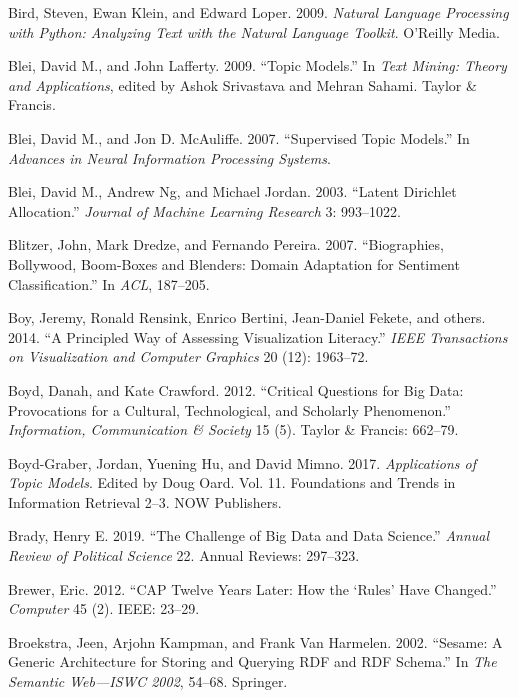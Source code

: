 \documentclass[]{krantz}
\begin{document}
\hypertarget{ref-bird-09}{}
Bird, Steven, Ewan Klein, and Edward Loper. 2009. \emph{Natural Language
Processing with Python: Analyzing Text with the Natural Language
Toolkit}. O'Reilly Media.

\hypertarget{ref-blei-09}{}
Blei, David M., and John Lafferty. 2009. ``Topic Models.'' In \emph{Text
Mining: Theory and Applications}, edited by Ashok Srivastava and Mehran
Sahami. Taylor \& Francis.

\hypertarget{ref-blei-07b}{}
Blei, David M., and Jon D. McAuliffe. 2007. ``Supervised Topic Models.''
In \emph{Advances in Neural Information Processing Systems}.

\hypertarget{ref-blei-03}{}
Blei, David M., Andrew Ng, and Michael Jordan. 2003. ``Latent Dirichlet
Allocation.'' \emph{Journal of Machine Learning Research} 3: 993--1022.

\hypertarget{ref-blitzer-07}{}
Blitzer, John, Mark Dredze, and Fernando Pereira. 2007. ``Biographies,
Bollywood, Boom-Boxes and Blenders: Domain Adaptation for Sentiment
Classification.'' In \emph{ACL}, 187--205.

\hypertarget{ref-boy2014principled}{}
Boy, Jeremy, Ronald Rensink, Enrico Bertini, Jean-Daniel Fekete, and
others. 2014. ``A Principled Way of Assessing Visualization Literacy.''
\emph{IEEE Transactions on Visualization and Computer Graphics} 20 (12):
1963--72.

\hypertarget{ref-boyd2012critical}{}
Boyd, Danah, and Kate Crawford. 2012. ``Critical Questions for Big Data:
Provocations for a Cultural, Technological, and Scholarly Phenomenon.''
\emph{Information, Communication \& Society} 15 (5). Taylor \& Francis:
662--79.

\hypertarget{ref-boyd-graber-17}{}
Boyd-Graber, Jordan, Yuening Hu, and David Mimno. 2017.
\emph{Applications of Topic Models}. Edited by Doug Oard. Vol. 11.
Foundations and Trends in Information Retrieval 2--3. NOW Publishers.

\hypertarget{ref-brady2019challenge}{}
Brady, Henry E. 2019. ``The Challenge of Big Data and Data Science.''
\emph{Annual Review of Political Science} 22. Annual Reviews: 297--323.

\hypertarget{ref-brewer2012cap}{}
Brewer, Eric. 2012. ``CAP Twelve Years Later: How the `Rules' Have
Changed.'' \emph{Computer} 45 (2). IEEE: 23--29.

\hypertarget{ref-broekstra2002sesame}{}
Broekstra, Jeen, Arjohn Kampman, and Frank Van Harmelen. 2002. ``Sesame:
A Generic Architecture for Storing and Querying RDF and RDF Schema.'' In
\emph{The Semantic Web---ISWC 2002}, 54--68. Springer.
\end{document}

